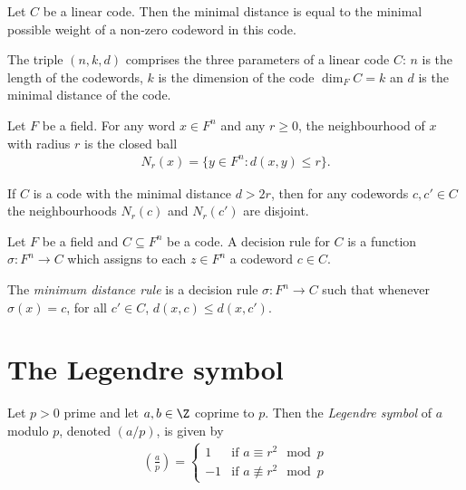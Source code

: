 \documentclass{article}
\begin{document}
\begin{lemma}[Lecture 10]
    Let $C$ be a linear code. Then the minimal distance is equal to the minimal possible weight 
    of a non-zero codeword in this code.
\end{lemma}

\begin{definition}[Lecture 10]
    The triple $(n,k,d)$ comprises the three parameters of a linear code $C$: $n$ is the length of the 
    codewords, $k$ is the dimension of the code $\dim_F C=k$ an $d$ is the minimal distance of the code.
\end{definition}

\begin{definition}[Lecture 10]
    Let $F$ be a field. For any word $x\in F^n$ and any $r\geq 0$, the neighbourhood of $x$ with radius 
    $r$ is the closed ball 
    \begin{align*}
        N_r(x)=\{y\in F^n : d(x,y)\leq r\}. 
    \end{align*}
\end{definition}

\begin{lemma}[Lecture 10]
    If $C$ is a code with the minimal distance $d>2r$, then for any codewords $c,c'\in C$ the neighbourhoods
    $N_r(c)$ and $N_r(c')$ are disjoint. 
\end{lemma}

\begin{definition}[Lecture 10]
    Let $F$ be a field and $C\subseteq F^n$ be a code. A decision rule for $C$ is a function 
    $\sigma:F^n\to C$ which assigns to each $z\in F^n$ a codeword $c\in C$.
\end{definition}

\begin{definition}
    The \emph{minimum distance rule} is a decision rule $\sigma:F^n\to C$ such that 
    whenever $\sigma(x)=c$, for all $c'\in C$, $d(x,c) \leq d(x,c')$.
\end{definition}

\section{The Legendre symbol}

\begin{definition}
    Let $p>0$ prime and let $a,b\in\Z$ coprime to $p$.
    Then the \emph{Legendre symbol} of $a$ modulo $p$, denoted $(a/p)$, is given by 
    \begin{align*}
        \left(\frac{a}{p}\right)=\begin{cases}
            1 &\text{if }a\equiv r^2\mod p\\
            -1 &\text{if }a\not\equiv r^2\mod p
        \end{cases}
    \end{align*}
\end{definition}
\end{document}
